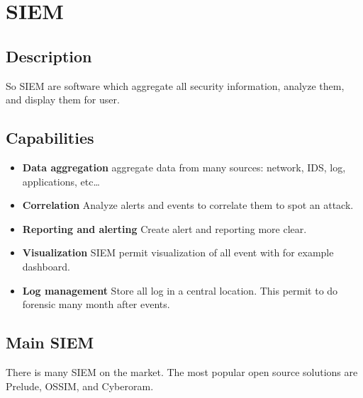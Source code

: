 
\chapter{SIEM}
\label{chap:project}


\section{Description}



So SIEM are software which aggregate all security information, analyze them, and display them for user.

\section{Capabilities}

\begin{itemize}
\item \textbf{Data aggregation} aggregate data from many sources: network, IDS, log, applications, etc\dots
\item \textbf{Correlation} Analyze alerts and events to correlate them to spot an attack.
\item \textbf{Reporting and alerting} Create alert and reporting more clear.
\item \textbf{Visualization} SIEM permit visualization of all event with for example dashboard.
\item \textbf{Log management} Store all log in a central location. This permit to do forensic many month after
  events.
\end{itemize}


\section{Main SIEM}

There is many SIEM on the market. The most popular open source solutions are Prelude, OSSIM, and Cyberoram.






